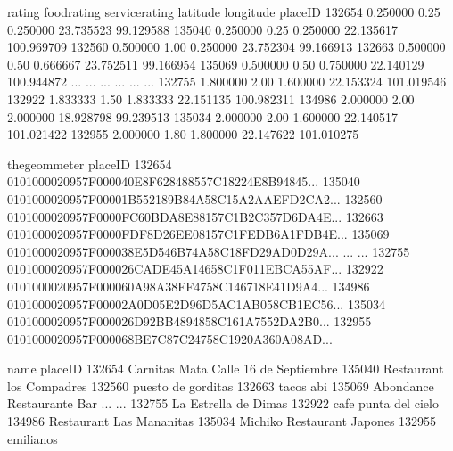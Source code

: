 \documentclass[letterpaper,10pt,english]{jupyterBook}
\begin{document}
\begin{sphinxVerbatim}[commandchars=\\\{\}]
           rating  food\PYGZus{}rating  service\PYGZus{}rating   latitude   longitude  \PYGZbs{}
placeID                                                                 
132654   0.250000         0.25        0.250000  23.735523  \PYGZhy{}99.129588   
135040   0.250000         0.25        0.250000  22.135617 \PYGZhy{}100.969709   
132560   0.500000         1.00        0.250000  23.752304  \PYGZhy{}99.166913   
132663   0.500000         0.50        0.666667  23.752511  \PYGZhy{}99.166954   
135069   0.500000         0.50        0.750000  22.140129 \PYGZhy{}100.944872   
...           ...          ...             ...        ...         ...   
132755   1.800000         2.00        1.600000  22.153324 \PYGZhy{}101.019546   
132922   1.833333         1.50        1.833333  22.151135 \PYGZhy{}100.982311   
134986   2.000000         2.00        2.000000  18.928798  \PYGZhy{}99.239513   
135034   2.000000         2.00        1.600000  22.140517 \PYGZhy{}101.021422   
132955   2.000000         1.80        1.800000  22.147622 \PYGZhy{}101.010275   

                                            the\PYGZus{}geom\PYGZus{}meter  \PYGZbs{}
placeID                                                      
132654   0101000020957F000040E8F628488557C18224E8B94845...   
135040   0101000020957F00001B552189B84A58C15A2AAEFD2CA2...   
132560   0101000020957F0000FC60BDA8E88157C1B2C357D6DA4E...   
132663   0101000020957F0000FDF8D26EE08157C1FEDB6A1FDB4E...   
135069   0101000020957F000038E5D546B74A58C18FD29AD0D29A...   
...                                                    ...   
132755   0101000020957F000026CADE45A14658C1F011EBCA55AF...   
132922   0101000020957F000060A98A38FF4758C146718E41D9A4...   
134986   0101000020957F00002A0D05E2D96D5AC1AB058CB1EC56...   
135034   0101000020957F000026D92BB4894858C161A7552DA2B0...   
132955   0101000020957F000068BE7C87C24758C1920A360A08AD...   

                                          name  \PYGZbs{}
placeID                                          
132654   Carnitas Mata  Calle 16 de Septiembre   
135040                Restaurant los Compadres   
132560                      puesto de gorditas   
132663                               tacos abi   
135069               Abondance Restaurante Bar   
...                                        ...   
132755                    La Estrella de Dimas   
132922                    cafe punta del cielo   
134986                Restaurant Las Mananitas   
135034              Michiko Restaurant Japones   
132955                               emilianos   


\end{sphinxVerbatim}
\end{document}
